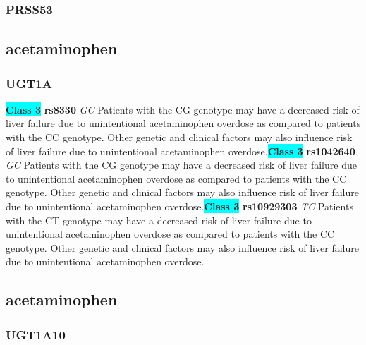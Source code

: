 \documentclass{book}
\begin{document}
\subsubsection{ PRSS53 }

\begin{center}



\end{center}\subsection{ acetaminophen }


\subsubsection{ UGT1A }

\begin{center}
\textbf{\colorbox{cyan} {Class 3}} \textbf{ rs8330 } \textit{ GC }
Patients with the CG genotype may have a decreased risk of liver failure due to unintentional acetaminophen overdose as compared to patients with the CC genotype. Other genetic and clinical factors may also influence risk of liver failure due to unintentional acetaminophen overdose.\textbf{\colorbox{cyan} {Class 3}} \textbf{ rs1042640 } \textit{ GC }
Patients with the CG genotype may have a decreased risk of liver failure due to unintentional acetaminophen overdose as compared to patients with the CC genotype. Other genetic and clinical factors may also influence risk of liver failure due to unintentional acetaminophen overdose.\textbf{\colorbox{cyan} {Class 3}} \textbf{ rs10929303 } \textit{ TC }
Patients with the CT genotype may have a decreased risk of liver failure due to unintentional acetaminophen overdose as compared to patients with the CC genotype. Other genetic and clinical factors may also influence risk of liver failure due to unintentional acetaminophen overdose.


\end{center}\subsection{ acetaminophen }


\subsubsection{ UGT1A10 }
\end{document}
